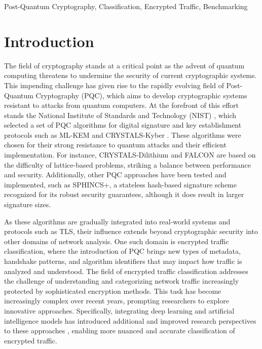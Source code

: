 \documentclass[10pt,journal]{IEEEtran}%
\begin{document}
\begin{IEEEkeywords}
Post-Quantum Cryptography, Classification, Encrypted Traffic, Benchmarking
\end{IEEEkeywords}

\section{Introduction}

\label{sec:intro}
The field of cryptography stands at a critical point as the advent of quantum computing threatens to undermine the security of current cryptographic systems. This impending challenge has given rise to the rapidly evolving field of Post-Quantum Cryptography (PQC), which aims to develop cryptographic systems resistant to attacks from quantum computers. At the forefront of this effort stands the National Institute of Standards and Technology (NIST) \cite{nist_stand}, which selected a set of PQC algorithms for digital signature and key establishment protocols such as ML-KEM and CRYSTALS-Kyber \cite{avanzi2017crystals}. These algorithms were chosen for their strong resistance to quantum attacks and their efficient implementation. For instance, CRYSTALS-Dilithium and FALCON are based on the difficulty of lattice-based problems, striking a balance between performance and security. Additionally, other PQC approaches have been tested and implemented, such as SPHINCS+, a stateless hash-based signature scheme recognized for its robust security guarantees, although it does result in larger signature sizes.

As these algorithms are gradually integrated into real-world systems and protocols such as TLS, their influence extends beyond cryptographic security into other domains of network analysis. One such domain is encrypted traffic classification, where the introduction of PQC brings new types of metadata, handshake patterns, and algorithm identifiers that may impact how traffic is analyzed and understood. The field of encrypted traffic classification addresses the challenge of understanding and categorizing network traffic increasingly protected by sophisticated encryption methods. This task has become increasingly complex over recent years, prompting researchers to explore innovative approaches. Specifically, integrating deep learning and artificial intelligence models has introduced additional and improved research perspectives to these approaches \cite{zhang2023tfe, dillbary2024hidden, bader2024osf, huoh2022flow, aceto2021distiller, shen2021accurate}, enabling more nuanced and accurate classification of encrypted traffic.
\end{document}
